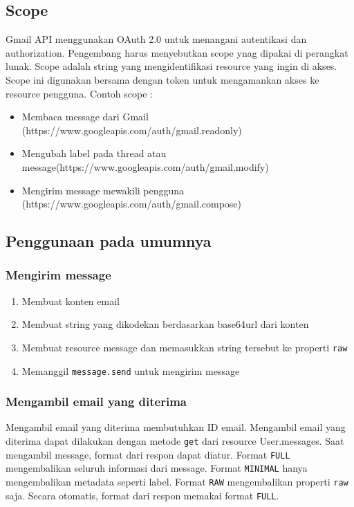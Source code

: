 \subsection{Scope}
Gmail API menggunakan OAuth 2.0 untuk menangani autentikasi dan authorization. Pengembang harus menyebutkan scope ynag dipakai di perangkat lunak. Scope adalah string yang mengidentifikasi resource yang ingin di akses. Scope ini digunakan bersama dengan token untuk mengamankan akses ke resource pengguna. Contoh scope :
\begin{itemize}
\item Membaca message dari Gmail (https://www.googleapis.com/auth/gmail.readonly)
\item Mengubah label pada thread atau message(https://www.googleapis.com/auth/gmail.modify)
\item Mengirim message mewakili pengguna (https://www.googleapis.com/auth/gmail.compose)
\end{itemize}

\subsection{Penggunaan pada umumnya}
\subsubsection{Mengirim message}
\begin{enumerate}
\item Membuat konten email
\item Membuat string yang dikodekan berdasarkan base64url dari konten
\item Membuat resource message dan memasukkan string tersebut ke properti \texttt{raw}
\item Memanggil \texttt{message.send} untuk mengirim message
\end{enumerate}

\subsubsection{Mengambil email yang diterima}
Mengambil email yang diterima membutuhkan ID email. Mengambil email yang diterima dapat dilakukan dengan metode \texttt{get} dari resource User.messages. Saat mengambil message, format dari respon dapat diatur. Format \texttt{FULL} mengembalikan seluruh informasi dari message. Format \texttt{MINIMAL} hanya mengembalikan metadata seperti label. Format \texttt{RAW} mengembalikan properti \texttt{raw} saja. Secara otomatis, format dari respon memakai format \texttt{FULL}.

